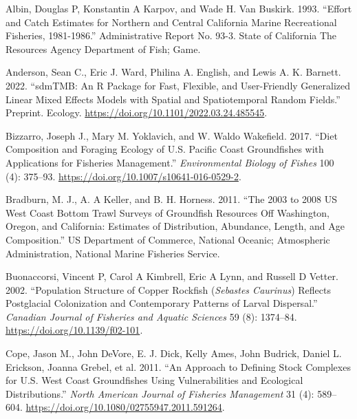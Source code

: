\documentclass[11pt,
  english,
  letterpaper,
]{article}
\newlength{\cslhangindent}
\newenvironment{CSLReferences}[2] %
 {%
  \setlength{\parindent}{0pt}
  \ifodd #1 \everypar{\setlength{\hangindent}{\cslhangindent}}\ignorespaces\fi
  \ifnum #2 > 0
  \setlength{\parskip}{#2\baselineskip}
  \fi
 }%
 {}
\begin{document}
\hypertarget{refs}{}
\begin{CSLReferences}{1}{0}
\leavevmode{}%
Albin, Douglas P, Konstantin A Karpov, and Wade H. Van Buskirk. 1993. {``Effort and Catch Estimates for {Northern} and {Central} {California} Marine Recreational Fisheries, 1981-1986.''} Administrative Report No. 93-3. State of California The Resources Agency Department of Fish; Game.

\leavevmode{}%
Anderson, Sean C., Eric J. Ward, Philina A. English, and Lewis A. K. Barnett. 2022. {``{sdmTMB}: An {R} Package for Fast, Flexible, and User-Friendly Generalized Linear Mixed Effects Models with Spatial and Spatiotemporal Random Fields.''} Preprint. Ecology. \url{https://doi.org/10.1101/2022.03.24.485545}.

\leavevmode{}%
Bizzarro, Joseph J., Mary M. Yoklavich, and W. Waldo Wakefield. 2017. {``Diet Composition and Foraging Ecology of {U}.{S}. {Pacific} {Coast} Groundfishes with Applications for Fisheries Management.''} \emph{Environmental Biology of Fishes} 100 (4): 375--93. \url{https://doi.org/10.1007/s10641-016-0529-2}.

\leavevmode{}%
Bradburn, M. J., A. A Keller, and B. H. Horness. 2011. {``The 2003 to 2008 {US} {West} {Coast} Bottom Trawl Surveys of Groundfish Resources Off {Washington}, {Oregon}, and {California}: Estimates of Distribution, Abundance, Length, and Age Composition.''} US Department of Commerce, National Oceanic; Atmospheric Administration, National Marine Fisheries Service.

\leavevmode{}%
Buonaccorsi, Vincent P, Carol A Kimbrell, Eric A Lynn, and Russell D Vetter. 2002. {``Population Structure of Copper Rockfish (\emph{{Sebastes} Caurinus}) Reflects Postglacial Colonization and Contemporary Patterns of Larval Dispersal.''} \emph{Canadian Journal of Fisheries and Aquatic Sciences} 59 (8): 1374--84. \url{https://doi.org/10.1139/f02-101}.

\leavevmode{}%
Cope, Jason M., John DeVore, E. J. Dick, Kelly Ames, John Budrick, Daniel L. Erickson, Joanna Grebel, et al. 2011. {``An {Approach} to {Defining} {Stock} {Complexes} for {U}.{S}. {West} {Coast} {Groundfishes} {Using} {Vulnerabilities} and {Ecological} {Distributions}.''} \emph{North American Journal of Fisheries Management} 31 (4): 589--604. \url{https://doi.org/10.1080/02755947.2011.591264}.


\end{CSLReferences}
\end{document}
